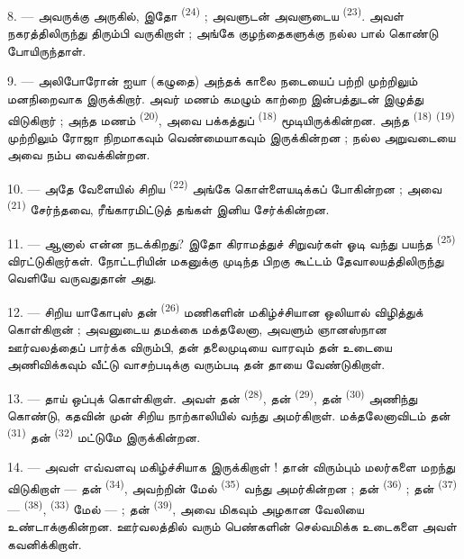 8. --- அவருக்கு அருகில், இதோ  \textsuperscript{(24)} ; அவளுடன்
அவளுடைய  \textsuperscript{(23)}. அவள் நகரத்திலிருந்து திரும்பி
வருகிறாள் ; அங்கே குழந்தைகளுக்கு நல்ல பால் கொண்டு போயிருந்தாள்.

\VUsaut{4.0mm}
\VUsaut{3.4mm}

9. --- அலிபோரோன் ஐயா (கழுதை) அந்தக் காலை நடையைப் பற்றி முற்றிலும் மனநிறைவாக
இருக்கிறார். அவர் மணம் கமழும் காற்றை இன்பத்துடன் இழுத்து விடுகிறார் ; அந்த
மணம்  \textsuperscript{(20)}, அவை பக்கத்துப்
  \textsuperscript{(18)}
மூடியிருக்கின்றன. அந்த  \textsuperscript{(18)}
 \textsuperscript{(19)} முற்றிலும் ரோஜா
நிறமாகவும் வெண்மையாகவும் இருக்கின்றன ; நல்ல அறுவடையை அவை நம்ப வைக்கின்றன.

10. --- அதே வேளையில் சிறிய  \textsuperscript{(22)} அங்கே
கொள்ளையடிக்கப் போகின்றன ; அவை  \textsuperscript{(21)}
சேர்ந்தவை, ரீங்காரமிட்டுத் தங்கள் இனிய  சேர்க்கின்றன.

11. --- ஆனால் என்ன நடக்கிறது? இதோ கிராமத்துச் சிறுவர்கள் ஓடி வந்து பயந்த
 \textsuperscript{(25)} விரட்டுகிறார்கள். நோட்டரியின்
மகனுக்கு  முடிந்த பிறகு கூட்டம் தேவாலயத்திலிருந்து
வெளியே வருவதுதான் அது.

12. --- சிறிய யாகோபுஸ் தன்  \textsuperscript{(26)}
மணிகளின் மகிழ்ச்சியான ஒலியால் விழித்துக் கொள்கிறான் ; அவனுடைய தமக்கை
மக்தலேனா, அவளும் ஞானஸ்நான ஊர்வலத்தைப் பார்க்க விரும்பி, தன் தலைமுடியை
வாரவும் தன் உடையை அணிவிக்கவும் வீட்டு வாசற்படிக்கு வரும்படி தன் தாயை
வேண்டுகிறாள்.

13. --- தாய் ஒப்புக் கொள்கிறாள். அவள் தன் 
\textsuperscript{(28)}, தன்  \textsuperscript{(29)}, தன்
 \textsuperscript{(30)} அணிந்து கொண்டு, கதவின் முன்
சிறிய நாற்காலியில் வந்து அமர்கிறாள். மக்தலேனாவிடம் தன் 
\textsuperscript{(31)} தன்  \textsuperscript{(32)}
மட்டுமே இருக்கின்றன.

14. --- அவள் எவ்வளவு மகிழ்ச்சியாக இருக்கிறாள் ! தான் விரும்பும் மலர்களை
மறந்து விடுகிறாள் — தன்  \textsuperscript{(34)}, அவற்றின்
மேல்  \textsuperscript{(35)} வந்து அமர்கின்றன ;
தன்  \textsuperscript{(36)} ; தன் 
\textsuperscript{(37)} —  \textsuperscript{(38)},
 \textsuperscript{(33)} மேல் — ; தன் 
\textsuperscript{(39)}, அவை மிகவும் அழகான வேலியை உண்டாக்குகின்றன. ஊர்வலத்தில்
வரும் பெண்களின் செல்வமிக்க உடைகளை அவள் கவனிக்கிறாள்.

